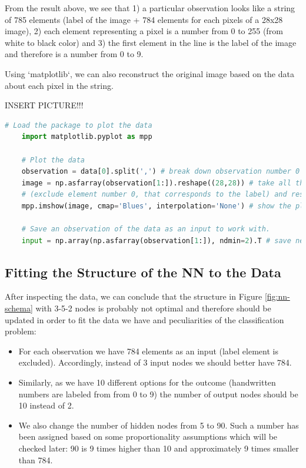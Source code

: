 From the result above, we see that 1) a particular observation looks like a string of 785 elements (label of the image + 784 elements for each pixels of a 28x28 image), 2) each element representing a pixel is a number from 0 to 255 (from white to black color) and 3) the first element in the line is the label of the image and therefore is a number from 0 to 9.

Using `matplotlib`, we can also reconstruct the original image based on the data about each pixel in the string.

INSERT PICTURE!!!

\begin{lstlisting}[language=Python]
    # Load the package to plot the data
    import matplotlib.pyplot as mpp

    # Plot the data
    observation = data[0].split(',') # break down observation number 0 (comma is used to identify each element).
    image = np.asfarray(observation[1:]).reshape((28,28)) # take all the elements starting from the element 1 
    # (exclude element number 0, that corresponds to the label) and reshape them as an array with dimension 28 by 28.
    mpp.imshow(image, cmap='Blues', interpolation='None') # show the plot of this array using blue pallete.

    # Save an observation of the data as an input to work with.
    input = np.array(np.asfarray(observation[1:]), ndmin=2).T # save necessary elements in a vertical vector shape.
\end{lstlisting}


\subsection{Fitting the Structure of the NN to the Data}

After inspecting the data, we can conclude that the structure in Figure \ref{fig:nn-schema} with 3-5-2 nodes is probably not optimal and therefore should be updated in order to fit the data we have and peculiarities of the classification problem: 

\begin{itemize}
    \item For each observation we have 784 elements as an input (label element is excluded). Accordingly, instead of 3 input nodes we should better have 784.
    \item Similarly, as we have 10 different options for the outcome (handwritten numbers are labeled from from 0 to 9) the number of output nodes should be 10 instead of 2. 
    \item We also change the number of hidden nodes from 5 to 90. Such a number has been assigned based on some proportionality assumptions which will be checked later: 90 is 9 times higher than 10 and approximately 9 times smaller than 784.
\end{itemize}

